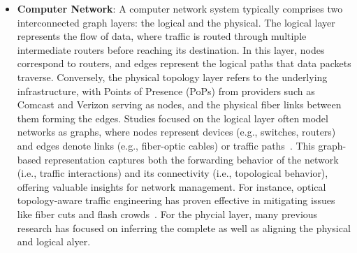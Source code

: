 \begin{itemize}[leftmargin=*]
    Station-level graphs: subway station graphs, bus station graphs, bike station graphs, railway station graphs, car-sharing station graphs, parking lot graphs, and parking block graphs. Natural links between stations are used to defined the edges, e.g., subway or railway lines, or the road networks. 

    \item \textbf{Computer Network}: A computer network system typically comprises two interconnected graph layers: the logical and the physical. The logical layer represents the flow of data, where traffic is routed through multiple intermediate routers before reaching its destination. In this layer, nodes correspond to routers, and edges represent the logical paths that data packets traverse. Conversely, the physical topology layer refers to the underlying infrastructure, with Points of Presence (PoPs) from providers such as Comcast and Verizon serving as nodes, and the physical fiber links between them forming the edges. Studies focused on the logical layer often model networks as graphs, where nodes represent devices (e.g., switches, routers) and edges denote links (e.g., fiber-optic cables) or traffic paths~\cite{ji2020traffic, zheng2019gcn}. This graph-based representation captures both the forwarding behavior of the network (i.e., traffic interactions) and its connectivity (i.e., topological behavior), offering valuable insights for network management. For instance, optical topology-aware traffic engineering has proven effective in mitigating issues like fiber cuts and flash crowds~\cite{nance2023improving}. For the phycial layer, many previous research has focused on inferring the complete as well as aligning the physical and logical alyer.
\end{itemize}

